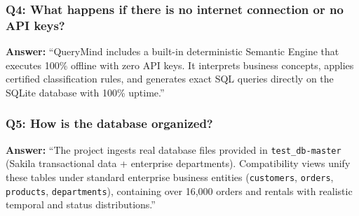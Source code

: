 \documentclass[10pt,a4paper]{article}
\begin{document}
\subsubsection{Q4: What happens if there is no internet connection or no API keys?}
\textbf{Answer:} ``QueryMind includes a built-in deterministic Semantic Engine that executes 100\% offline with zero API keys. It interprets business concepts, applies certified classification rules, and generates exact SQL queries directly on the SQLite database with 100\% uptime.''

\subsubsection{Q5: How is the database organized?}
\textbf{Answer:} ``The project ingests real database files provided in \texttt{test\_db-master} (Sakila transactional data + enterprise departments). Compatibility views unify these tables under standard enterprise business entities (\texttt{customers}, \texttt{orders}, \texttt{products}, \texttt{departments}), containing over 16,000 orders and rentals with realistic temporal and status distributions.''
\end{document}
